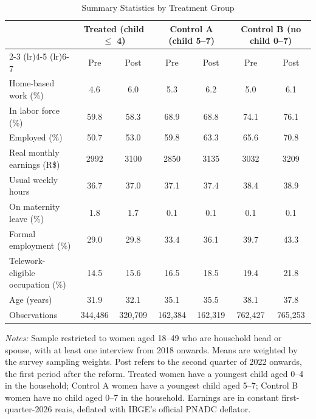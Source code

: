 \begin{table}[H]
\centering
\caption{Summary Statistics by Treatment Group}
\label{tab:descriptives}
\footnotesize\setlength{\tabcolsep}{4pt}
\begin{tabular}{lcccccc}
\toprule
 & \multicolumn{2}{c}{Treated (child $\leq$ 4)} & \multicolumn{2}{c}{Control A (child 5--7)} & \multicolumn{2}{c}{Control B (no child 0--7)} \\
\cmidrule(lr){2-3} \cmidrule(lr){4-5} \cmidrule(lr){6-7}
 & Pre & Post & Pre & Post & Pre & Post \\
\midrule
Home-based work (\%) & 4.6 & 6.0 & 5.3 & 6.2 & 5.0 & 6.1 \\
In labor force (\%) & 59.8 & 58.3 & 68.9 & 68.8 & 74.1 & 76.1 \\
Employed (\%) & 50.7 & 53.0 & 59.8 & 63.3 & 65.6 & 70.8 \\
Real monthly earnings (R\$) & 2992 & 3100 & 2850 & 3135 & 3032 & 3209 \\
Usual weekly hours & 36.7 & 37.0 & 37.1 & 37.4 & 38.4 & 38.9 \\
On maternity leave (\%) & 1.8 & 1.7 & 0.1 & 0.1 & 0.1 & 0.1 \\
Formal employment (\%) & 29.0 & 29.8 & 33.4 & 36.1 & 39.7 & 43.3 \\
Telework-eligible occupation (\%) & 14.5 & 15.6 & 16.5 & 18.5 & 19.4 & 21.8 \\
Age (years) & 31.9 & 32.1 & 35.1 & 35.5 & 38.1 & 37.8 \\
\midrule
Observations & 344,486 & 320,709 & 162,384 & 162,319 & 762,427 & 765,253 \\
\bottomrule
\end{tabular}
\par\vspace{3pt}\footnotesize\raggedright \textit{Notes:} Sample restricted to women aged 18--49 who are household head or spouse, with at least one interview from 2018 onwards. Means are weighted by the survey sampling weights. Post refers to the second quarter of 2022 onwards, the first period after the reform. Treated women have a youngest child aged 0--4 in the household; Control A women have a youngest child aged 5--7; Control B women have no child aged 0--7 in the household. Earnings are in constant first-quarter-2026 reais, deflated with IBGE's official PNADC deflator.
\end{table}
